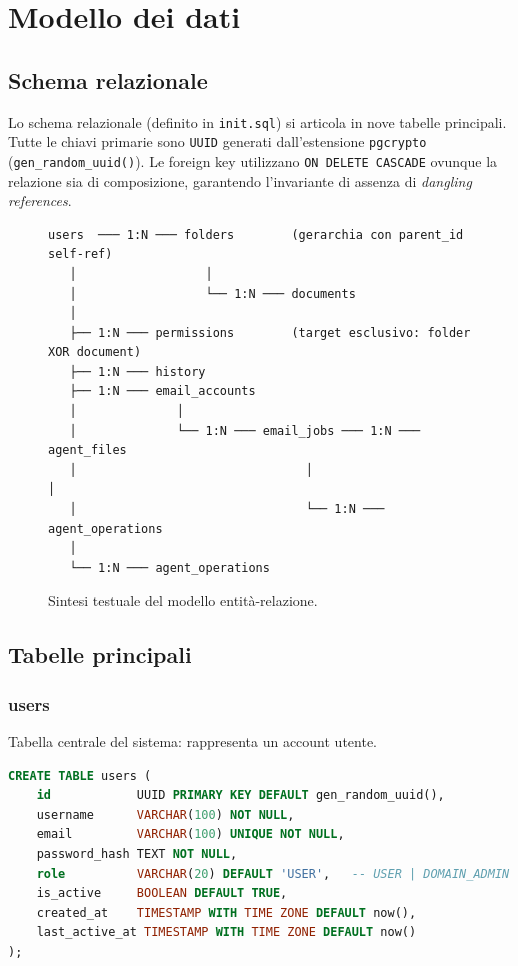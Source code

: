 \chapter{Modello dei dati}
\label{chap:database}

\section{Schema relazionale}
\label{sec:schema}

Lo schema relazionale (definito in \texttt{init.sql}) si articola in nove tabelle principali.
Tutte le chiavi primarie sono \texttt{UUID} generati dall'estensione \texttt{pgcrypto}
(\texttt{gen\_random\_uuid()}). Le foreign key utilizzano \texttt{ON DELETE CASCADE}
ovunque la relazione sia di composizione, garantendo l'invariante di assenza di
\emph{dangling references}.

\begin{figure}[ht]
\footnotesize
\begin{verbatim}
users  ─── 1:N ─── folders        (gerarchia con parent_id self-ref)
   │                  │
   │                  └── 1:N ─── documents
   │
   ├── 1:N ─── permissions        (target esclusivo: folder XOR document)
   ├── 1:N ─── history
   ├── 1:N ─── email_accounts
   │              │
   │              └── 1:N ─── email_jobs ─── 1:N ─── agent_files
   │                                │                      │
   │                                └── 1:N ─── agent_operations
   │
   └── 1:N ─── agent_operations
\end{verbatim}
\caption{Sintesi testuale del modello entit\`a-relazione.}
\label{fig:erd}
\end{figure}

\section{Tabelle principali}
\label{sec:tabelle_principali}

\subsection{users}

Tabella centrale del sistema: rappresenta un account utente.

\begin{lstlisting}[language=SQL, caption={DDL della tabella \texttt{users}.}]
CREATE TABLE users (
    id            UUID PRIMARY KEY DEFAULT gen_random_uuid(),
    username      VARCHAR(100) NOT NULL,
    email         VARCHAR(100) UNIQUE NOT NULL,
    password_hash TEXT NOT NULL,
    role          VARCHAR(20) DEFAULT 'USER',   -- USER | DOMAIN_ADMIN
    is_active     BOOLEAN DEFAULT TRUE,
    created_at    TIMESTAMP WITH TIME ZONE DEFAULT now(),
    last_active_at TIMESTAMP WITH TIME ZONE DEFAULT now()
);
\end{lstlisting}

